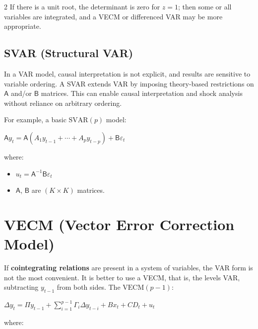 \documentclass[10pt, a4paper, landscape]{article}
\begin{document}
\begin{multicols}{2}
If there is a unit root, the determinant is zero for \( z = 1 \); then some or all variables are integrated, and a VECM or differenced VAR may be more appropriate.

\subsection*{SVAR (Structural VAR)}

In a VAR model, causal interpretation is not explicit, and results are sensitive to variable ordering. A SVAR extends VAR by imposing theory-based restrictions on \( \mathsf{A} \) and/or \( \mathsf{B} \) matrices. This can enable causal interpretation and shock analysis without reliance on arbitrary ordering.

For example, a basic \( \text{SVAR}(p) \) model:

\begin{center}
	\( \mathsf{A} y_t = \mathsf{A} (A_1 y_{t - 1} + \cdots + A_p y_{t - p}) + \mathsf{B} \varepsilon_t \)
\end{center}

where:

\begin{itemize}[leftmargin=*]
	\item \( u_t = \mathsf{A}^{-1} \mathsf{B} \varepsilon_t \)
	\item \( \mathsf{A} \), \( \mathsf{B} \) are \( (K \times K) \) matrices.
\end{itemize}

\columnbreak

\section*{VECM (Vector Error Correction Model)}

If \textbf{cointegrating relations} are present in a system of variables, the VAR form is not the most convenient. It is better to use a VECM, that is, the levels VAR, subtracting \( y_{t - 1} \) from both sides. The \( \text{VECM}(p - 1) \):

\begin{center}
	\( \Delta y_{t} = \Pi y_{t - 1} + \sum_{i = 1}^{p - 1} \Gamma_{i} \Delta y_{t - i} + B x_{t} + CD_{t} + u_{t} \)
\end{center}

where:


\end{multicols}
\end{document}
